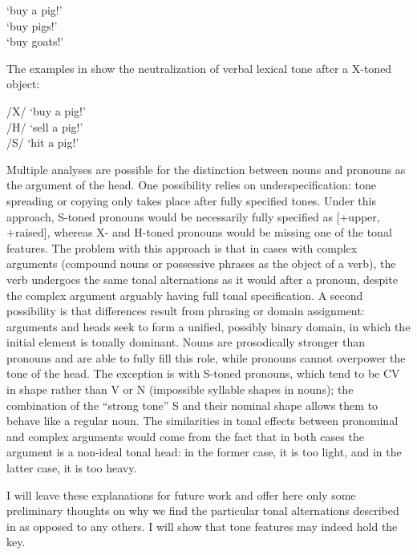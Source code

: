 \documentclass[output=paper]{langsci/langscibook}
\begin{document}
\ea\label{ex:mcpherson:20} 
\ea\label{ex:mcpherson:20a} { } `buy a pig!' \\
\ex\label{ex:mcpherson:20b} { } `buy pigs!' \\
\ex\label{ex:mcpherson:20c} { } `buy goats!' \\
\z
\z

The examples in  show the neutralization of verbal lexical tone after a X-toned object:

\ea\label{ex:mcpherson:21} 
\ea\label{ex:mcpherson:21a} /X/ { } `buy a pig!' \\
\ex\label{ex:mcpherson:21b} /H/ { } `sell a pig!' \\
\ex\label{ex:mcpherson:21c} /S/ { } `hit a pig!' \\
\z
\z

 
Multiple analyses are possible for the distinction between nouns and pronouns as the argument of the head. One possibility relies on underspecification: tone spreading or copying only takes place after fully specified tones. Under this approach, S-toned pronouns would be necessarily fully specified as [+upper, +raised], whereas X- and H-toned pronouns would be missing one of the tonal features. The problem with this approach is that in cases with complex arguments (compound nouns or possessive phrases as the object of a verb), the verb undergoes the same tonal alternations as it would after a pronoun, despite the complex argument arguably having full tonal specification. A second possibility is that differences result from phrasing or domain assignment: arguments and heads seek to form a unified, possibly binary domain, in which the initial element is tonally dominant. Nouns are prosodically stronger than pronouns and are able to fully fill this role, while pronouns cannot overpower the tone of the head. The exception is with S-toned pronouns, which tend to be CV in shape rather than V or N (impossible syllable shapes in nouns); the combination of the ``strong tone'' S and their nominal shape allows them to behave like a regular noun. The similarities in tonal effects between pronominal and complex arguments would come from the fact that in both cases the argument is a non-ideal tonal head: in the former case, it is too light, and in the latter case, it is too heavy.

I will leave these explanations for future work and offer here only some preliminary thoughts on why we find the particular tonal alternations described in  as opposed to any others. I will show that tone features may indeed hold the key.
\end{document}
